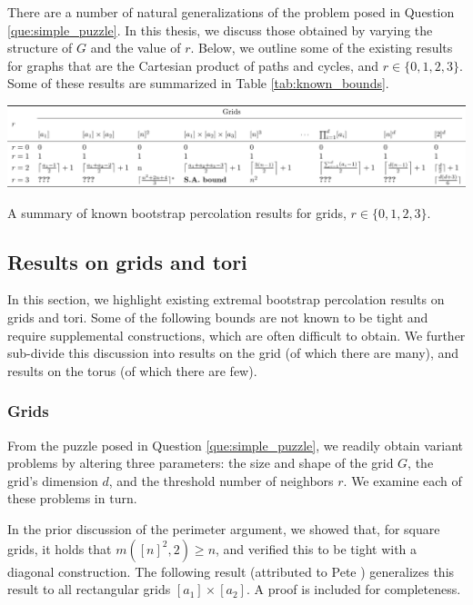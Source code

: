 There are a number of natural generalizations of the problem posed in Question \ref{que:simple_puzzle}. In this thesis, we discuss those obtained by varying the structure of $G$ and the value of $r$. Below, we outline some of the existing results for graphs that are the Cartesian product of paths and cycles, and $r \in \{0, 1, 2, 3\}$. Some of these results are summarized in Table \ref{tab:known_bounds}.

\begin{table}[]
\centering
\includegraphics[width=\textwidth,origin=c]{tables/1/known_bounds.pdf}
\caption{A summary of known bootstrap percolation results for grids, $r \in \{0,1,2,3\}$.}
\label{tab:known_bounds}
\end{table} 

\subsection{Results on grids and tori}
\label{sec:result_summary}

In this section, we highlight existing extremal bootstrap percolation results on grids and tori. Some of the following bounds are not known to be tight and require supplemental constructions, which are often difficult to obtain. We further sub-divide this discussion into results on the grid (of which there are many), and results on the torus (of which there are few).

\subsubsection{Grids}

From the puzzle posed in Question \ref{que:simple_puzzle}, we readily obtain variant problems by altering three parameters: the size and shape of the grid $G$, the grid's dimension $d$, and the threshold number of neighbors $r$. We examine each of these problems in turn.

In the prior discussion of the perimeter argument, we showed that, for square grids, it holds that $m([n]^2, 2) \geq n$, and verified this to be tight with a diagonal construction. The following result (attributed to Pete \cite{pete1997make}) generalizes this result to all rectangular grids $[a_1] \times [a_2]$. A proof is included for completeness. 

